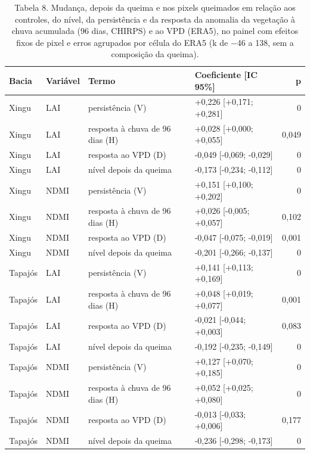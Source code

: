 \begin{table}
\caption{Tabela 8. Mudança, depois da queima e nos pixels queimados em relação aos controles, do nível, da persistência e da resposta da anomalia da vegetação à chuva acumulada (96 dias, CHIRPS) e ao VPD (ERA5), no painel com efeitos fixos de pixel e erros agrupados por célula do ERA5 (k de −46 a 138, sem a composição da queima).}
\label{tab:12_floresta_atmosfera::painel}
\begin{tabular}{llllr}
\toprule
Bacia & Variável & Termo & Coeficiente [IC 95\%] & p \\
\midrule
Xingu & LAI & persistência (V) & +0,226 [+0,171; +0,281] & 0 \\
Xingu & LAI & resposta à chuva de 96 dias (H) & +0,028 [+0,000; +0,055] & 0,049 \\
Xingu & LAI & resposta ao VPD (D) & -0,049 [-0,069; -0,029] & 0 \\
Xingu & LAI & nível depois da queima & -0,173 [-0,234; -0,112] & 0 \\
Xingu & NDMI & persistência (V) & +0,151 [+0,100; +0,202] & 0 \\
Xingu & NDMI & resposta à chuva de 96 dias (H) & +0,026 [-0,005; +0,057] & 0,102 \\
Xingu & NDMI & resposta ao VPD (D) & -0,047 [-0,075; -0,019] & 0,001 \\
Xingu & NDMI & nível depois da queima & -0,201 [-0,266; -0,137] & 0 \\
Tapajós & LAI & persistência (V) & +0,141 [+0,113; +0,169] & 0 \\
Tapajós & LAI & resposta à chuva de 96 dias (H) & +0,048 [+0,019; +0,077] & 0,001 \\
Tapajós & LAI & resposta ao VPD (D) & -0,021 [-0,044; +0,003] & 0,083 \\
Tapajós & LAI & nível depois da queima & -0,192 [-0,235; -0,149] & 0 \\
Tapajós & NDMI & persistência (V) & +0,127 [+0,070; +0,185] & 0 \\
Tapajós & NDMI & resposta à chuva de 96 dias (H) & +0,052 [+0,025; +0,080] & 0 \\
Tapajós & NDMI & resposta ao VPD (D) & -0,013 [-0,033; +0,006] & 0,177 \\
Tapajós & NDMI & nível depois da queima & -0,236 [-0,298; -0,173] & 0 \\
\bottomrule
\end{tabular}
\end{table}
